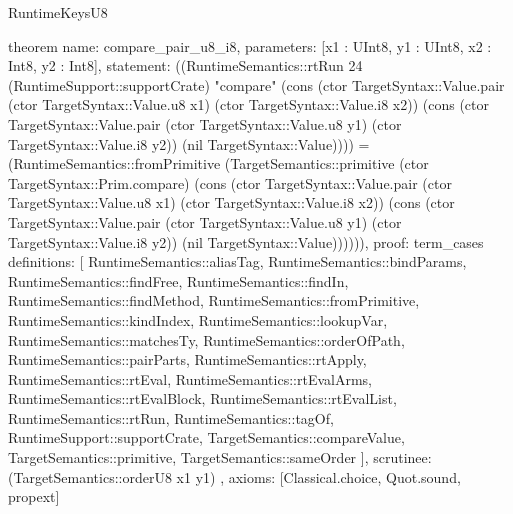 \begin{lexlean}{RuntimeKeysU8}
\begin{semanticmodule}
theorem{
  name: compare_pair_u8_i8,
  parameters: [x1 : UInt8, y1 : UInt8, x2 : Int8, y2 : Int8],
  statement: ((RuntimeSemantics::rtRun 24 (RuntimeSupport::supportCrate) "compare" (cons (ctor TargetSyntax::Value.pair (ctor TargetSyntax::Value.u8 x1) (ctor TargetSyntax::Value.i8 x2)) (cons (ctor TargetSyntax::Value.pair (ctor TargetSyntax::Value.u8 y1) (ctor TargetSyntax::Value.i8 y2)) (nil TargetSyntax::Value)))) = (RuntimeSemantics::fromPrimitive (TargetSemantics::primitive (ctor TargetSyntax::Prim.compare) (cons (ctor TargetSyntax::Value.pair (ctor TargetSyntax::Value.u8 x1) (ctor TargetSyntax::Value.i8 x2)) (cons (ctor TargetSyntax::Value.pair (ctor TargetSyntax::Value.u8 y1) (ctor TargetSyntax::Value.i8 y2)) (nil TargetSyntax::Value)))))),
  proof: term_cases{
    definitions: [
      RuntimeSemantics::aliasTag,
      RuntimeSemantics::bindParams,
      RuntimeSemantics::findFree,
      RuntimeSemantics::findIn,
      RuntimeSemantics::findMethod,
      RuntimeSemantics::fromPrimitive,
      RuntimeSemantics::kindIndex,
      RuntimeSemantics::lookupVar,
      RuntimeSemantics::matchesTy,
      RuntimeSemantics::orderOfPath,
      RuntimeSemantics::pairParts,
      RuntimeSemantics::rtApply,
      RuntimeSemantics::rtEval,
      RuntimeSemantics::rtEvalArms,
      RuntimeSemantics::rtEvalBlock,
      RuntimeSemantics::rtEvalList,
      RuntimeSemantics::rtRun,
      RuntimeSemantics::tagOf,
      RuntimeSupport::supportCrate,
      TargetSemantics::compareValue,
      TargetSemantics::primitive,
      TargetSemantics::sameOrder
    ],
    scrutinee: (TargetSemantics::orderU8 x1 y1)
  },
  axioms: [Classical.choice, Quot.sound, propext]
}


\end{semanticmodule}
\end{lexlean}
